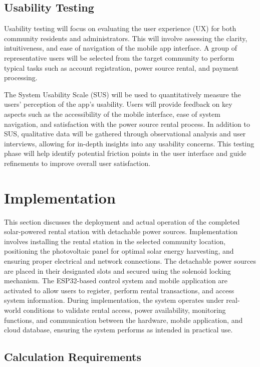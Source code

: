 {\subsection{Usability Testing}
Usability testing will focus on evaluating the user experience (UX) for both community residents and administrators. This will involve assessing the clarity, intuitiveness, and ease of navigation of the mobile app interface. A group of representative users will be selected from the target community to perform typical tasks such as account registration, power source rental, and payment processing.

The System Usability Scale (SUS) will be used to quantitatively measure the users’ perception of the app's usability. Users will provide feedback on key aspects such as the accessibility of the mobile interface, ease of system navigation, and satisfaction with the power source rental process. In addition to SUS, qualitative data will be gathered through observational analysis and user interviews, allowing for in-depth insights into any usability concerns. This testing phase will help identify potential friction points in the user interface and guide refinements to improve overall user satisfaction.

\section{Implementation}
This section discusses the deployment and actual operation of the completed solar-powered rental station with detachable power sources. Implementation involves installing the rental station in the selected community location, positioning the photovoltaic panel for optimal solar energy harvesting, and ensuring proper electrical and network connections. The detachable power sources are placed in their designated slots and secured using the solenoid locking mechanism. The ESP32-based control system and mobile application are activated to allow users to register, perform rental transactions, and access system information. During implementation, the system operates under real-world conditions to validate rental access, power availability, monitoring functions, and communication between the hardware, mobile application, and cloud database, ensuring the system performs as intended in practical use.

 \subsection{Calculation Requirements}
 
}
